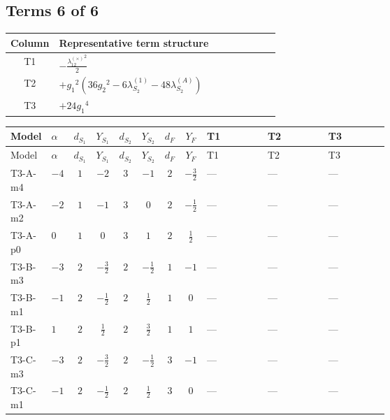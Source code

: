 \documentclass[8pt]{article}
\begin{document}
\begin{landscape}
\subsection*{Terms 6 of 6}
\begin{center}
\begin{tabular}{@{}c >{\raggedright\arraybackslash}p{0.82\linewidth}@{}}
\toprule
Column & Representative term structure \\
\midrule
T1 & \(\displaystyle -\frac{{\lambda_{12}^{(\times)}}^2}{2}\) \\
\midrule
T2 & \(\displaystyle +{g_1}^2 \left(36 {g_2}^2-6 {\lambda_{S_2}^{(1)}}-48 {\lambda_{S_2}^{(A)}}\right)\) \\
\midrule
T3 & \(\displaystyle +24 {g_1}^4\) \\
\midrule
\bottomrule
\end{tabular}
\end{center}
\smallskip
\tiny
\begin{longtable}{@{}llcccccc >{\raggedright\arraybackslash}p{0.21\linewidth} >{\raggedright\arraybackslash}p{0.21\linewidth} >{\raggedright\arraybackslash}p{0.21\linewidth}@{}}
\toprule
Model & $\alpha$ & $d_{S_1}$ & $Y_{S_1}$ & $d_{S_2}$ & $Y_{S_2}$ & $d_F$ & $Y_F$ & T1 & T2 & T3 \\
\midrule
\endfirsthead
\toprule
Model & $\alpha$ & $d_{S_1}$ & $Y_{S_1}$ & $d_{S_2}$ & $Y_{S_2}$ & $d_F$ & $Y_F$ & T1 & T2 & T3 \\
\midrule
\endhead
T3-A-m4 & $-4$ & $1$ & $-2$ & $3$ & $-1$ & $2$ & $-\frac{3}{2}$ & --- & --- & --- \\
\midrule
T3-A-m2 & $-2$ & $1$ & $-1$ & $3$ & $0$ & $2$ & $-\frac{1}{2}$ & --- & --- & --- \\
\midrule
T3-A-p0 & $0$ & $1$ & $0$ & $3$ & $1$ & $2$ & $\frac{1}{2}$ & --- & --- & --- \\
\midrule
T3-B-m3 & $-3$ & $2$ & $-\frac{3}{2}$ & $2$ & $-\frac{1}{2}$ & $1$ & $-1$ & --- & --- & --- \\
\midrule
T3-B-m1 & $-1$ & $2$ & $-\frac{1}{2}$ & $2$ & $\frac{1}{2}$ & $1$ & $0$ & --- & --- & --- \\
\midrule
T3-B-p1 & $1$ & $2$ & $\frac{1}{2}$ & $2$ & $\frac{3}{2}$ & $1$ & $1$ & --- & --- & --- \\
\midrule
T3-C-m3 & $-3$ & $2$ & $-\frac{3}{2}$ & $2$ & $-\frac{1}{2}$ & $3$ & $-1$ & --- & --- & --- \\
\midrule
T3-C-m1 & $-1$ & $2$ & $-\frac{1}{2}$ & $2$ & $\frac{1}{2}$ & $3$ & $0$ & --- & --- & --- \\

\end{longtable}
\end{landscape}
\end{document}
